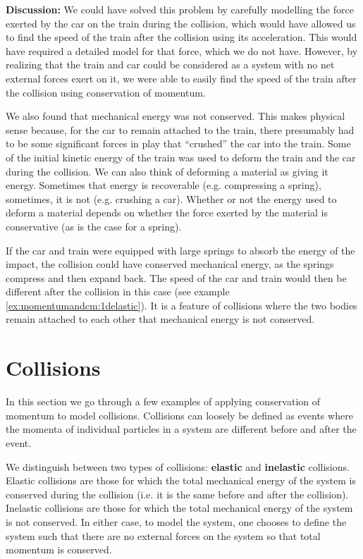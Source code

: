 \begin{example}
\textbf{Discussion: }We could have solved this problem by carefully modelling the force exerted by the car on the train during the collision, which would have allowed us to find the speed of the train after the collision using its acceleration. This would have required a detailed model for that force, which we do not have. However, by realizing that the train and car could be considered as a system with no net external forces exert on it, we were able to easily find the speed of the train after the collision using conservation of momentum.

We also found that mechanical energy was not conserved. This makes physical sense because, for the car to remain attached to the train, there presumably had to be some significant forces in play that ``crushed'' the car into the train. Some of the initial kinetic energy of the train was used to deform the train and the car during the collision. We can also think of deforming a material as giving it energy. Sometimes that energy is recoverable (e.g. compressing a spring), sometimes, it is not (e.g. crushing a car). Whether or not the energy used to deform a material depends on whether the force exerted by the material is conservative (as is the case for a spring).

If the car and train were equipped with large springs to absorb the energy of the impact, the collision could have conserved mechanical energy, as the springs compress and then expand back. The speed of the car and train would then be different after the collision in this case (see example \ref{ex:momentumandcm:1delastic}). It is a feature of collisions where the two bodies remain attached to each other that mechanical energy is not conserved.
\end{example}

\section{Collisions}
In this section we go through a few examples of applying conservation of momentum to model collisions. Collisions can loosely be defined as events where the momenta of individual particles in a system are different before and after the event.

We distinguish between two types of collisions: \textbf{elastic} and \textbf{inelastic} collisions. Elastic collisions are those for which the total mechanical energy of the system is conserved during the collision (i.e. it is the same before and after the collision). Inelastic collisions are those for which the total mechanical energy of the system is not conserved. In either case, to model the system, one chooses to define the system such that there are no external forces on the system so that total momentum is conserved.

